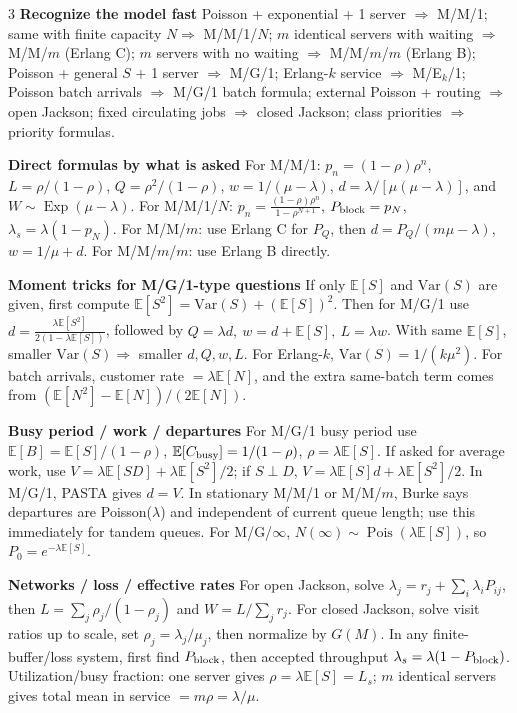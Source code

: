 \documentclass[a4paper,8pt,fleqn]{extarticle}
\newcommand{\E}{\mathbb{E}}
\newcommand{\Var}{\mathrm{Var}}
\newcommand{\1}{\mathbf{1}}
\newcommand{\sub}[1]{\textbf{#1} }
\DeclareMathOperator{\Pois}{Pois}
\DeclareMathOperator{\Exp}{Exp}
\begin{document}
\begin{multicols}{3}
\sub{Recognize the model fast}
Poisson + exponential + 1 server \(\Rightarrow\) M/M/1; same with finite capacity \(N\Rightarrow\) M/M/1/\(N\); \(m\) identical servers with waiting \(\Rightarrow\) M/M/\(m\) (Erlang C); \(m\) servers with no waiting \(\Rightarrow\) M/M/\(m\)/\(m\) (Erlang B); Poisson + general \(S\) + 1 server \(\Rightarrow\) M/G/1; Erlang-\(k\) service \(\Rightarrow\) M/E\(_k\)/1; Poisson batch arrivals \(\Rightarrow\) M/G/1 batch formula; external Poisson + routing \(\Rightarrow\) open Jackson; fixed circulating jobs \(\Rightarrow\) closed Jackson; class priorities \(\Rightarrow\) priority formulas.

\sub{Direct formulas by what is asked}
For M/M/1: \(p_n=(1-\rho)\rho^n\), \(L=\rho/(1-\rho)\), \(Q=\rho^2/(1-\rho)\), \(w=1/(\mu-\lambda)\), \(d=\lambda/[\mu(\mu-\lambda)]\), and \(W\sim\Exp(\mu-\lambda)\). For M/M/1/\(N\): \(\displaystyle p_n=\frac{(1-\rho)\rho^n}{1-\rho^{N+1}}\), \(P_{\rm block}=p_N\), \(\lambda_s=\lambda(1-p_N)\). For M/M/\(m\): use Erlang C for \(P_Q\), then \(d=P_Q/(m\mu-\lambda)\), \(w=1/\mu+d\). For M/M/\(m\)/\(m\): use Erlang B directly.

\sub{Moment tricks for M/G/1-type questions}
If only \(\E[S]\) and \(\Var(S)\) are given, first compute \(\E[S^2]=\Var(S)+(\E[S])^2\). Then for M/G/1 use \(\displaystyle d=\frac{\lambda\E[S^2]}{2(1-\lambda\E[S])}\), followed by \(Q=\lambda d,\ w=d+\E[S],\ L=\lambda w\). With same \(\E[S]\), smaller \(\Var(S)\Rightarrow\) smaller \(d,Q,w,L\). For Erlang-\(k\), \(\Var(S)=1/(k\mu^2)\). For batch arrivals, customer rate \(=\lambda\E[N]\), and the extra same-batch term comes from \((\E[N^2]-\E[N])/(2\E[N])\).

\sub{Busy period / work / departures}
For M/G/1 busy period use \(\E[B]=\E[S]/(1-\rho)\), \(\E[C_{\rm busy}]=1/(1-\rho)\), \(\rho=\lambda\E[S]\). If asked for average work, use \(V=\lambda\E[SD]+\lambda\E[S^2]/2\); if \(S\perp D\), \(V=\lambda\E[S]d+\lambda\E[S^2]/2\). In M/G/1, PASTA gives \(d=V\). In stationary M/M/1 or M/M/\(m\), Burke says departures are Poisson(\(\lambda\)) and independent of current queue length; use this immediately for tandem queues. For M/G/\(\infty\), \(N(\infty)\sim\Pois(\lambda\E[S])\), so \(P_0=e^{-\lambda\E[S]}\).

\sub{Networks / loss / effective rates}
For open Jackson, solve \(\lambda_j=r_j+\sum_i\lambda_iP_{ij}\), then \(L=\sum_j \rho_j/(1-\rho_j)\) and \(W=L/\sum_j r_j\). For closed Jackson, solve visit ratios up to scale, set \(\rho_j=\lambda_j/\mu_j\), then normalize by \(G(M)\). In any finite-buffer/loss system, first find \(P_{\rm block}\), then accepted throughput \(\lambda_s=\lambda(1-P_{\rm block})\). Utilization/busy fraction: one server gives \(\rho=\lambda\E[S]=L_s\); \(m\) identical servers gives total mean in service \(=m\rho=\lambda/\mu\).


\end{multicols}
\end{document}
